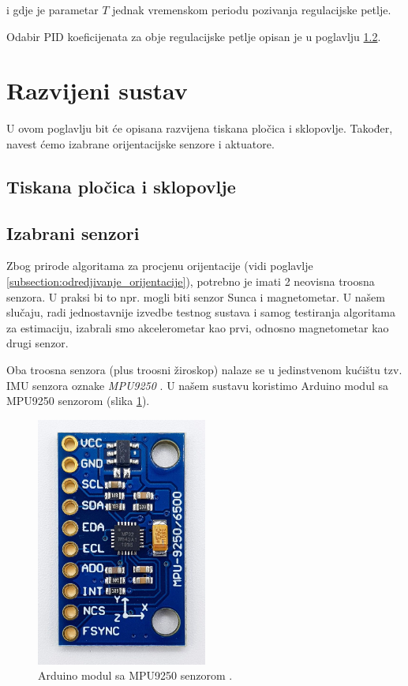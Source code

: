 \documentclass[times, utf8, diplomski, numeric]{templates/template}
\begin{document}
{{{{                i gdje je parametar $T$ jednak vremenskom periodu pozivanja regulacijske petlje.

                Odabir PID koeficijenata za obje regulacijske petlje opisan je u poglavlju \ref{}.
            }
        }
    }

    \section{Razvijeni sustav}{
        U ovom poglavlju bit će opisana razvijena tiskana pločica i sklopovlje. Također, navest ćemo izabrane orijentacijske senzore i aktuatore.

        \subsection{Tiskana pločica i sklopovlje}{
        }

        \subsection{Izabrani senzori}{
            Zbog prirode algoritama za procjenu orijentacije (vidi poglavlje \ref{subsection:odredjivanje_orijentacije}), potrebno je imati 2 neovisna troosna senzora. U praksi bi to npr. mogli biti senzor Sunca i magnetometar. U našem slučaju, radi jednostavnije izvedbe testnog sustava i samog testiranja algoritama za estimaciju, izabrali smo akcelerometar kao prvi, odnosno magnetometar kao drugi senzor. 

            Oba troosna senzora (plus troosni žiroskop) nalaze se u jedinstvenom kućištu tzv. IMU  senzora oznake \emph{MPU9250} \cite{mpu9250_datasheet}. U našem sustavu koristimo Arduino modul sa MPU9250 senzorom (slika \ref{fig:mpu9250}).

            \begin{figure}[htb]
            \centering
            \includegraphics[width=0.5\textwidth]{images/mpu9250.jpg}
            \caption{Arduino modul sa MPU9250 senzorom \cite{wolles_mpu9250}.}
            \label{fig:mpu9250}
            \end{figure}

}}}
\end{document}
